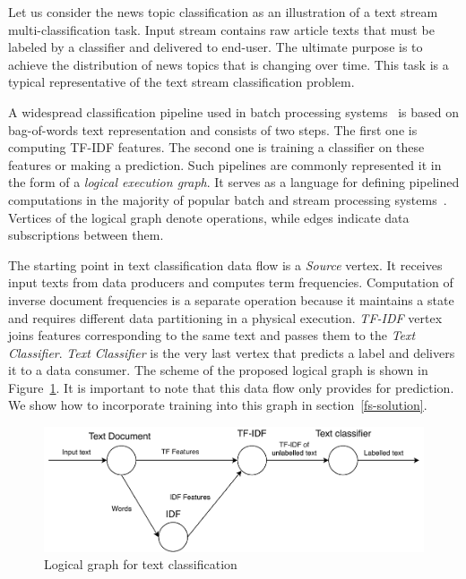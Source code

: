 \label{fs-framework}

Let us consider the news topic classification as an illustration of a text stream multi-classification task. Input stream contains raw article texts that must be labeled by a classifier and delivered to end-user. The ultimate purpose is to achieve the distribution of news topics that is changing over time. This task is a typical representative of the text stream classification problem.

A widespread classification pipeline used in batch processing systems~\cite{semberecki2016distributed} is based on bag-of-words text representation and consists of two steps. The first one is computing TF-IDF features. The second one is training a classifier on these features or making a prediction. Such pipelines are commonly represented it in the form of a {\em logical execution graph}. It serves as a language for defining pipelined computations in the majority of popular batch and stream processing systems~\cite{Carbone:2017:SMA:3137765.3137777, Zaharia:2016:ASU:3013530.2934664, apache:storm, Kulkarni:2015:THS:2723372.2742788, Noghabi:2017:SSS:3137765.3137770}. Vertices of the logical graph denote operations, while edges indicate data subscriptions between them. 

The starting point in text classification data flow is a {\em Source} vertex. It receives input texts from data producers and computes term frequencies. Computation of inverse document frequencies is a separate operation because it maintains a state and requires different data partitioning in a physical execution. {\em TF-IDF} vertex joins features corresponding to the same text and passes them to the {\em Text Classifier}. {\em Text Classifier} is the very last vertex that predicts a label and delivers it to a data consumer. The scheme of the proposed logical graph is shown in Figure~\ref{logical_graph}. It is important to note that this data flow only provides for prediction. 
We show how to incorporate training into this graph  in section~\ref{fs-solution}.


\begin{figure}[htbp]
  \centering
  \includegraphics[scale=0.52]{pics/logical-graph-no-part-fit}
  \caption{Logical graph for text classification}
  \label {logical_graph}
\end{figure}

